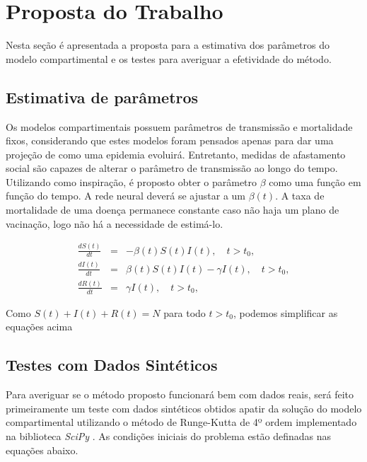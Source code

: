\chapter{Proposta do Trabalho}
\label{sec-proposta}

Nesta seção é apresentada a proposta para a estimativa dos parâmetros do 
modelo compartimental e os testes para averiguar a efetividade do método.

\section{Estimativa de parâmetros}

Os modelos compartimentais possuem parâmetros de transmissão e mortalidade
fixos, considerando que estes modelos foram pensados apenas para dar 
uma projeção de como uma epidemia evoluirá. Entretanto, medidas de afastamento
social são capazes de alterar o parâmetro de transmissão ao longo do tempo.
Utilizando \cite{long-etal:21-L2} como inspiração, é proposto obter o parâmetro
$\beta$ como uma função em função do tempo. A rede neural deverá se ajustar 
a um $\beta(t)$. A taxa de mortalidade de uma doença permanece constante
caso não haja um plano de vacinação, logo não há a necessidade de estimá-lo. 

\begin{eqnarray}
   \frac{dS(t)}{dt} &=& -\beta(t) S(t) I(t),  \quad t > t_0, \label{eq:SIR-beta-t-1}\\
   \frac{dI(t)}{dt} &=& \beta(t) S(t) I(t) - \gamma I(t), \quad t > t_0, \label{eq:SIR-beta-t-2}\\
   \frac{dR(t)}{dt} &=& \gamma I(t),  \quad t > t_0, \label{eq:SIR-beta-t-3}
\end{eqnarray}

Como $S(t) + I(t) + R(t) = N$ para todo $t > t_0$, podemos simplificar as equações
acima \cite{millevoi-etal:24-split-join-pinns}

\section{Testes com Dados Sintéticos}

Para averiguar se o método proposto funcionará bem com dados reais,
será feito primeiramente um teste com dados sintéticos obtidos apatir da solução
do modelo compartimental utilizando o método de Runge-Kutta de 4º ordem
implementado na biblioteca \textit{SciPy} \cite{scipy}. As condições iniciais
do problema estão definadas nas equações abaixo.

